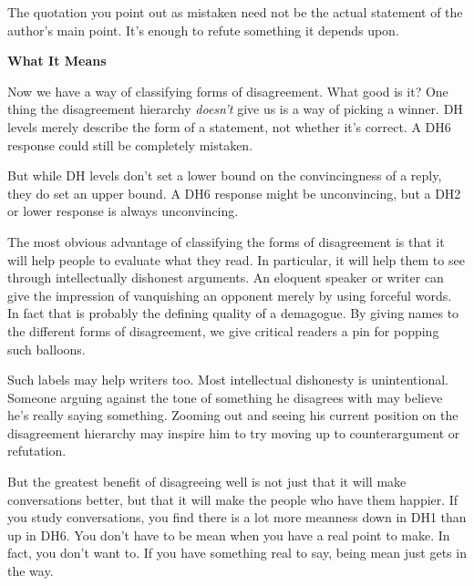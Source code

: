                   The quotation you point out as mistaken need not be the actual
                  statement of the author's main point. It's enough to refute
                  something it depends upon.


                  \textbf{What It Means}

Now we have a way of
                  classifying forms of disagreement. What good is it? One thing
                  the disagreement hierarchy \emph{doesn't} give us is a way of
                  picking a winner. DH levels merely describe the form of a
                  statement, not whether it's correct. A DH6 response could
                  still be completely mistaken.

But while DH levels
                  don't set a lower bound on the convincingness of a reply, they
                  do set an upper bound. A DH6 response might be unconvincing,
                  but a DH2 or lower response is always unconvincing.

The
                  most obvious advantage of classifying the forms of
                  disagreement is that it will help people to evaluate what they
                  read. In particular, it will help them to see through
                  intellectually dishonest arguments. An eloquent speaker or
                  writer can give the impression of vanquishing an opponent
                  merely by using forceful words. In fact that is probably the
                  defining quality of a demagogue. By giving names to the
                  different forms of disagreement, we give critical readers a
                  pin for popping such balloons.

Such labels may help
                  writers too. Most intellectual dishonesty is unintentional.
                  Someone arguing against the tone of something he disagrees
                  with may believe he's really saying something. Zooming out and
                  seeing his current position on the disagreement hierarchy may
                  inspire him to try moving up to counterargument or
                  refutation.

But the greatest benefit of disagreeing
                  well is not just that it will make conversations better, but
                  that it will make the people who have them happier. If you
                  study conversations, you find there is a lot more meanness
                  down in DH1 than up in DH6. You don't have to be mean when you
                  have a real point to make. In fact, you don't want to. If you
                  have something real to say, being mean just gets in the
                  way.

